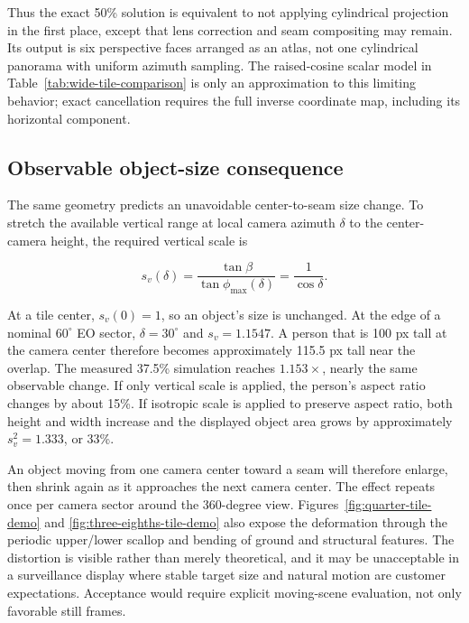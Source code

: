 \documentclass[10pt]{article}
\begin{document}
Thus the exact 50\% solution is equivalent to not applying cylindrical projection in the first place, except that lens correction and seam compositing may remain. Its output is six perspective faces arranged as an atlas, not one cylindrical panorama with uniform azimuth sampling. The raised-cosine scalar model in Table~\ref{tab:wide-tile-comparison} is only an approximation to this limiting behavior; exact cancellation requires the full inverse coordinate map, including its horizontal component.

\subsection{Observable object-size consequence}

The same geometry predicts an unavoidable center-to-seam size change. To stretch the available vertical range at local camera azimuth $\delta$ to the center-camera height, the required vertical scale is

\begin{equation}
s_v(\delta)
=
\frac{\tan\beta}{\tan\phi_{\max}(\delta)}
=
\frac{1}{\cos\delta}.
\label{eq:edge-scale}
\end{equation}

At a tile center, $s_v(0)=1$, so an object's size is unchanged. At the edge of a nominal $60^\circ$ EO sector, $\delta=30^\circ$ and $s_v=1.1547$. A person that is 100 px tall at the camera center therefore becomes approximately 115.5 px tall near the overlap. The measured 37.5\% simulation reaches $1.153\times$, nearly the same observable change. If only vertical scale is applied, the person's aspect ratio changes by about 15\%. If isotropic scale is applied to preserve aspect ratio, both height and width increase and the displayed object area grows by approximately $s_v^2=1.333$, or 33\%.

An object moving from one camera center toward a seam will therefore enlarge, then shrink again as it approaches the next camera center. The effect repeats once per camera sector around the 360-degree view. Figures~\ref{fig:quarter-tile-demo} and \ref{fig:three-eighths-tile-demo} also expose the deformation through the periodic upper/lower scallop and bending of ground and structural features. The distortion is visible rather than merely theoretical, and it may be unacceptable in a surveillance display where stable target size and natural motion are customer expectations. Acceptance would require explicit moving-scene evaluation, not only favorable still frames.
\end{document}

